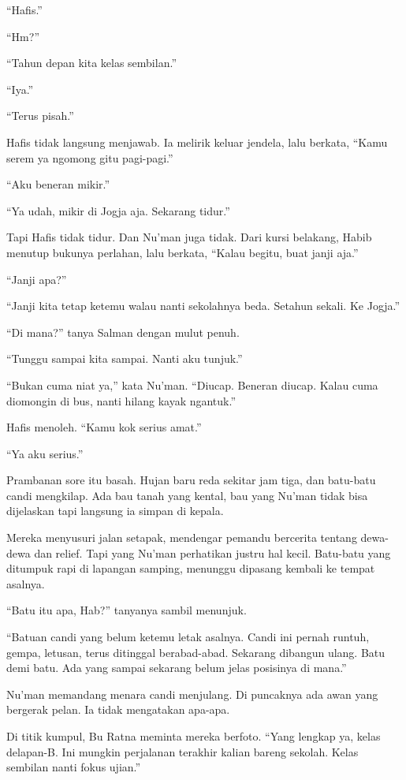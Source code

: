 ``Hafis.''

``Hm?''

``Tahun depan kita kelas sembilan.''

``Iya.''

``Terus pisah.''

Hafis tidak langsung menjawab. Ia melirik keluar jendela, lalu berkata, ``Kamu serem ya ngomong gitu pagi-pagi.''

``Aku beneran mikir.''

``Ya udah, mikir di Jogja aja. Sekarang tidur.''

Tapi Hafis tidak tidur. Dan Nu'man juga tidak. Dari kursi belakang, Habib menutup bukunya perlahan, lalu berkata, ``Kalau begitu, buat janji aja.''

``Janji apa?''

``Janji kita tetap ketemu walau nanti sekolahnya beda. Setahun sekali. Ke Jogja.''

``Di mana?'' tanya Salman dengan mulut penuh.

``Tunggu sampai kita sampai. Nanti aku tunjuk.''

``Bukan cuma niat ya,'' kata Nu'man. ``Diucap. Beneran diucap. Kalau cuma diomongin di bus, nanti hilang kayak ngantuk.''

Hafis menoleh. ``Kamu kok serius amat.''

``Ya aku serius.''

Prambanan sore itu basah. Hujan baru reda sekitar jam tiga, dan batu-batu candi mengkilap. Ada bau tanah yang kental, bau yang Nu'man tidak bisa dijelaskan tapi langsung ia simpan di kepala.

Mereka menyusuri jalan setapak, mendengar pemandu bercerita tentang dewa-dewa dan relief. Tapi yang Nu'man perhatikan justru hal kecil. Batu-batu yang ditumpuk rapi di lapangan samping, menunggu dipasang kembali ke tempat asalnya.

``Batu itu apa, Hab?'' tanyanya sambil menunjuk.

``Batuan candi yang belum ketemu letak asalnya. Candi ini pernah runtuh, gempa, letusan, terus ditinggal berabad-abad. Sekarang dibangun ulang. Batu demi batu. Ada yang sampai sekarang belum jelas posisinya di mana.''

Nu'man memandang menara candi menjulang. Di puncaknya ada awan yang bergerak pelan. Ia tidak mengatakan apa-apa.

Di titik kumpul, Bu Ratna meminta mereka berfoto. ``Yang lengkap ya, kelas delapan-B. Ini mungkin perjalanan terakhir kalian bareng sekolah. Kelas sembilan nanti fokus ujian.''

